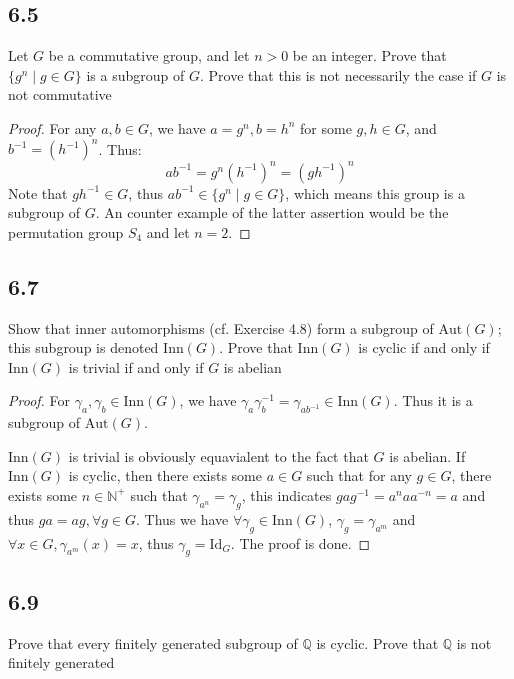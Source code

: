 \documentclass[a4paper, pdf, 12pt]{article}
\begin{document}
\subsection*{6.5}
Let $G$ be a commutative group, and let $n > 0$ be an integer. Prove that
$\{g^{n} \mid g \in G\}$ is a subgroup of $G$. Prove that this is not necessarily the case if $G$ is
not commutative
\begin{proof}
  For any $a, b\in G$, we have $a = g^{n}, b = h^{n}$ for some $g,h\in G$, and $b^{-1} = (h^{-1})^{n}$. Thus:
  $$
  ab^{-1} = g^{n} (h^{-1})^{n} = (gh^{-1})^n
  $$
  Note that $gh^{-1}\in G$, thus $ab^{-1}\in \{g^{n}\mid g\in G\}$, which means this group is a subgroup of $G$.
  An counter example of the latter assertion would be the permutation group $S_{4}$ and let $n = 2$.
\end{proof}

\subsection*{6.7}
Show that inner automorphisms (cf. Exercise 4.8) form a subgroup of
$\mbox{Aut}(G)$; this subgroup is denoted $\mbox{Inn}(G)$. Prove that $\mbox{Inn}(G)$ 
is cyclic if and only if $\mbox{Inn}(G)$ is trivial if and only if $G$ is abelian
\begin{proof}
  For $\gamma_{a}, \gamma_{b}\in \mbox{Inn}(G)$, we have $\gamma_{a}\gamma_{b}^{-1} = \gamma_{ab^{-1}}\in \mbox{Inn}(G)$. Thus 
  it is a subgroup of $\mbox{Aut}(G)$. 
  
  $\mbox{Inn}(G)$ is trivial is obviously equavialent to the fact that $G$ is abelian. If $\mbox{Inn}(G)$ is cyclic, then there exists 
  some $a\in G$ such that for any $g\in G$, there exists some $n\in \mathbb{N}^{+}$ such that $\gamma_{a^{n}} = \gamma_{g}$, this indicates
  $gag^{-1} = a^{n}aa^{-n} = a$ and thus $ga = ag, \forall g\in G$. Thus we have $\forall \gamma_{g}\in \mbox{Inn}(G)$, $\gamma_{g}=\gamma_{a^{m}}$
  and $\forall x\in G, \gamma_{a^{m}}(x) = x$, thus $\gamma_{g} = \mbox{Id}_{G}$. The proof is done.
\end{proof}

\subsection*{6.9}
Prove that every finitely generated subgroup of $\mathbb{Q}$ is cyclic. Prove that $\mathbb{Q}$ is
not finitely generated
\end{document}

